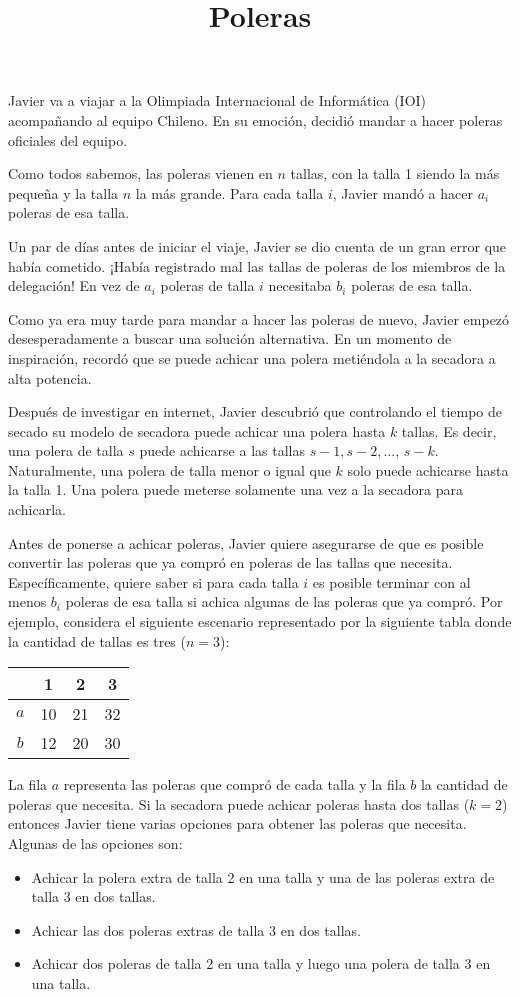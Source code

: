 \documentclass{oci}
\title{Poleras}
\begin{document}
\begin{problemDescription}
Javier va a viajar a la Olimpiada Internacional de Informática (IOI)
acompañando al equipo Chileno.
En su emoción, decidió mandar a hacer poleras oficiales del equipo.

Como todos sabemos, las poleras vienen en $n$ tallas, con la talla 1 siendo la más pequeña
y la talla $n$ la más grande.
Para cada talla $i$, Javier mandó a hacer $a_i$ poleras de esa talla.

Un par de días antes de iniciar el viaje, Javier se dio
cuenta de un gran error que había cometido.
¡Había registrado mal las tallas de poleras de los miembros de la delegación!
En vez de $a_i$ poleras de talla $i$ necesitaba $b_i$ poleras de esa talla.

Como ya era muy tarde para mandar a hacer las poleras de nuevo, Javier
empezó desesperadamente a buscar una solución alternativa.
En un momento de inspiración, recordó que se puede achicar una polera metiéndola a
la secadora a alta potencia.

Después de investigar en internet, Javier descubrió que controlando el tiempo de secado su
modelo de secadora puede achicar una polera hasta $k$ tallas.
Es decir, una polera de talla $s$ puede achicarse a las tallas $s-1, s-2, \dots$, $s-k$.
Naturalmente, una polera de talla menor o igual que $k$ solo puede achicarse hasta la talla 1.
Una polera puede meterse solamente una vez a la secadora para achicarla.

Antes de ponerse a achicar poleras, Javier quiere asegurarse de que es
posible convertir las poleras que ya compró en poleras de
las tallas que necesita.
Específicamente, quiere saber si para cada talla $i$ es posible terminar
con al menos $b_i$ poleras de esa talla si achica algunas de las poleras que ya compró.
Por ejemplo, considera el siguiente escenario representado por la siguiente tabla donde la cantidad
de tallas es tres ($n=3$):
\begin{center}
\begin{tabular}{cccc}
   & \footnotesize 1 & \footnotesize2  &  \footnotesize 3 \\
\hline
 $a$ & 10 & 21 & 32 \\
 $b$ & 12 & 20 & 30 \\
\hline
\end{tabular}
\end{center}
La fila $a$ representa las poleras que compró de cada talla y la fila $b$
la cantidad de poleras que necesita. Si la secadora puede achicar poleras
hasta dos tallas ($k=2$) entonces Javier tiene varias opciones para obtener las poleras
que necesita. Algunas de las opciones son:
\begin{itemize}
    \item Achicar la polera extra de talla 2 en una talla y una de las poleras extra de talla
        3 en dos tallas.
    \item Achicar las dos poleras extras de talla 3 en dos tallas.
    \item Achicar dos poleras de talla 2 en una talla y luego una polera de talla 3 en una talla.
\end{itemize}


\end{problemDescription}
\end{document}
